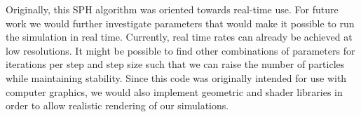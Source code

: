 \documentclass{scrartcl}
\begin{document}
Originally, this SPH algorithm was oriented towards real-time use. For future work we would further investigate parameters that would make it possible to run the simulation in real time. Currently, real time rates can already be achieved at low resolutions. It might be possible to find other combinations of parameters for iterations per step and step size such that we can raise the number of particles while maintaining stability. Since this code was originally intended for use with computer graphics, we would also implement geometric and shader libraries in order to allow realistic rendering of our simulations. 
\end{document}

